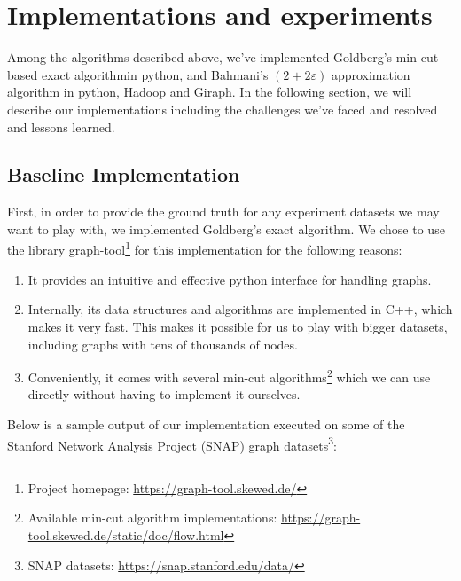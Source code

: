 \documentclass{article}
\begin{document}
\section{Implementations and experiments}
Among the algorithms described above, we've implemented Goldberg's min-cut based exact algorithmin python, and Bahmani's $(2+2\varepsilon)$ approximation algorithm in python, Hadoop and Giraph. In the following section, we will describe our implementations including the challenges we've faced and resolved and lessons learned.

\subsection{Baseline Implementation}
First, in order to provide the ground truth for any experiment datasets we may want to play with, we implemented Goldberg's exact algorithm. We chose to use the library graph-tool\footnote{Project homepage: \url{https://graph-tool.skewed.de/}} for this implementation for the following reasons:

\begin{enumerate}
  \item It provides an intuitive and effective python interface for handling graphs.
  \item Internally, its data structures and algorithms are implemented in C++, which makes it very fast. This makes it possible for us to play with bigger datasets, including graphs with tens of thousands of nodes.
  \item Conveniently, it comes with several min-cut algorithms\footnote{Available min-cut algorithm implementations: \url{https://graph-tool.skewed.de/static/doc/flow.html}} which we can use directly without having to implement it ourselves.
\end{enumerate}

Below is a sample output of our implementation executed on some of the Stanford Network Analysis Project (SNAP) graph datasets\footnote{SNAP datasets: \url{https://snap.stanford.edu/data/}}:
\end{document}

